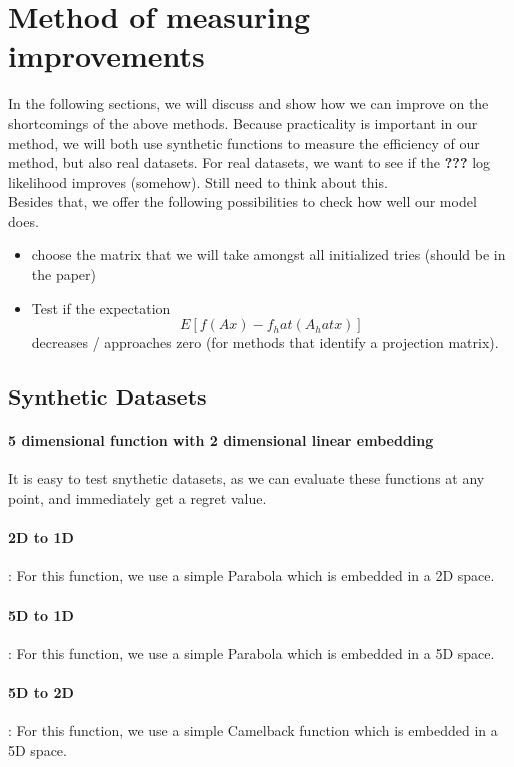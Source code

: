 \section{Method of measuring improvements}
In the following sections, we will discuss and show how we can improve on the shortcomings of the above methods.
Because practicality is important in our method, we will both use synthetic functions to measure the efficiency of our method, but also real datasets.
For real datasets, we want to see if the
\textbf{???} log likelihood improves (somehow).
Still need to think about this.\\

Besides that, we offer the following possibilities to check how well our model does.

\begin{itemize}
\item choose the matrix that we will take amongst all initialized tries (should be in the paper)
\item Test if the expectation $$ E[ f(A x) - f_hat(A_hat x) ] $$ decreases / approaches zero (for methods that identify a projection matrix).
\end{itemize}



\subsection{Synthetic Datasets}
\paragraph{5 dimensional function with 2 dimensional linear embedding}

It is easy to test snythetic datasets, as we can evaluate these functions at any point, and immediately get a regret value.

\paragraph{2D to 1D}: For this function, we use a simple Parabola which is embedded in a 2D space.
\paragraph{5D to 1D}: For this function, we use a simple Parabola which is embedded in a 5D space.
\paragraph{5D to 2D}: For this function, we use a simple Camelback function which is embedded in a 5D space.
